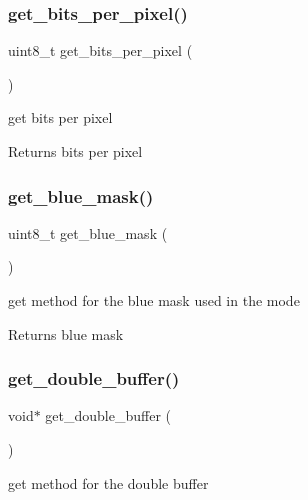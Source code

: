 \subsubsection{\texorpdfstring{get\+\_\+bits\+\_\+per\+\_\+pixel()}{get\_bits\_per\_pixel()}}
{\footnotesize\ttfamily uint8\+\_\+t get\+\_\+bits\+\_\+per\+\_\+pixel (\begin{DoxyParamCaption}{ }\end{DoxyParamCaption})}



get bits per pixel 

\begin{DoxyReturn}{Returns}
bits per pixel 
\end{DoxyReturn}
\mbox{\label{group__Video_ga653e6120b1631cc1c2c3e0dd7d1a2917}} 
\subsubsection{\texorpdfstring{get\+\_\+blue\+\_\+mask()}{get\_blue\_mask()}}
{\footnotesize\ttfamily uint8\+\_\+t get\+\_\+blue\+\_\+mask (\begin{DoxyParamCaption}{ }\end{DoxyParamCaption})}



get method for the blue mask used in the mode 

\begin{DoxyReturn}{Returns}
blue mask 
\end{DoxyReturn}
\mbox{\label{group__Video_ga92bcd933e2fd6e75a0c7c88a0b31452f}} 
\subsubsection{\texorpdfstring{get\+\_\+double\+\_\+buffer()}{get\_double\_buffer()}}
{\footnotesize\ttfamily void$\ast$ get\+\_\+double\+\_\+buffer (\begin{DoxyParamCaption}{ }\end{DoxyParamCaption})}



get method for the double buffer 


